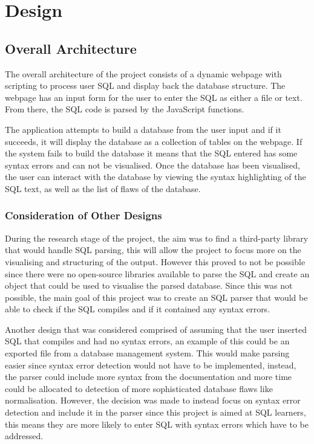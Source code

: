 \chapter{Design}

\section{Overall Architecture}

The overall architecture of the project consists of a dynamic webpage with scripting to process user SQL and display back the database structure. The webpage has an input form for the user to enter the SQL as either a file or text. From there, the SQL code is parsed by the JavaScript functions. 

The application attempts to build a database from the user input and if it succeeds, it will display the database as a collection of tables on the webpage. If the system fails to build the database it means that the SQL entered has some syntax errors and can not be visualised. Once the database has been visualised, the user can interact with the database by viewing the syntax highlighting of the SQL text, as well as the list of flaws of the database.

\subsection{Consideration of Other Designs}

During the research stage of the project, the aim was to find a third-party library that would handle SQL parsing, this will allow the project to focus more on the visualising and structuring of the output. However this proved to not be possible since there were no open-source libraries available to parse the SQL and create an object that could be used to visualise the parsed database. Since this was not possible, the main goal of this project was to create an SQL parser that would be able to check if the SQL compiles and if it contained any syntax errors.

Another design that was considered comprised of assuming that the user inserted SQL that compiles and had no syntax errors, an example of this could be an exported file from a database management system. This would make parsing easier since syntax error detection would not have to be implemented, instead, the parser could include more syntax from the documentation and more time could be allocated to detection of more sophisticated database flaws like normalisation. However, the decision was made to instead focus on syntax error detection and include it in the parser since this project is aimed at SQL learners, this means they are more likely to enter SQL with syntax errors which have to be addressed.


